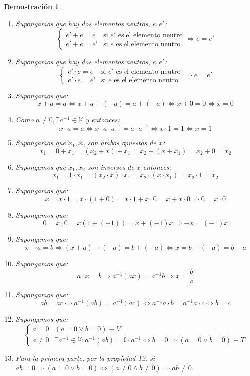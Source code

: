 \documentclass[10pt,a4paper,openright]{book}
\theoremstyle{break}
\newtheorem*{demo}{\underline{Demostración}}
\begin{document}
\begin{demo}
\begin{enumerate}
\item Supongamos que hay dos elementos neutros, $e, e'$:
 \begin{equation*}
 \begin{cases}
 e'+e=e & \mbox{si } e'\mbox{ es el elemento neutro} \\
 e'+e=e' & \mbox{si } e \mbox{ es el elemento neutro}
 \end{cases}
 \Rightarrow e=e'
 \end{equation*}
\item Supongamos que hay dos elementos neutros, $e, e'$:
 \begin{equation*}
 \begin{cases}
 e'\cdot e=e & \mbox{si } e'\mbox{ es el elemento neutro} \\
 e'\cdot e=e' & \mbox{si } e \mbox{ es el elemento neutro}
 \end{cases}
 \Rightarrow e=e'
 \end{equation*}
\item Supongamos que:
$$x+a=a\Leftrightarrow x+a+(-a)=a+(-a)\Leftrightarrow x+0=0 \Leftrightarrow x=0$$
\item Como $a\neq 0, \exists a^{-1}\in \mathbb K$ y entonces:
$$x\cdot a=a \Leftrightarrow x\cdot a \cdot a^{-1}=a\cdot a^{-1}\Leftrightarrow x\cdot 1=1 \Leftrightarrow x=1$$
\item Supongamos que $x_1, x_2$ son ambos opuestos de $x$:
$$x_1=0+x_1=(x_2+x)+x_1=x_2+(x+x_1)=x_2+0=x_2$$
\item Supongamos que $x_1, x_2$ son inversos de $x$ entonces:
$$x_1=1\cdot x_1=(x_2\cdot x)\cdot x_1=x_2\cdot (x\cdot x_1)=x_2\cdot 1=x_2$$
\item Supongamos que:
$$x=x\cdot 1=x\cdot (1+0)=x\cdot 1+ x\cdot 0=x+ x\cdot 0 \Rightarrow 0=x\cdot 0$$
\item Supongamos que:
$$0=x\cdot 0=x(1+(-1))=x+(-1)x \Rightarrow -x=(-1)x$$
\item Supongamos que:
$$x+a=b \Rightarrow (x+a)+(-a)=b+(-a)\Leftrightarrow x=b+(-a)=b-a$$
\item Supongamos que:
$$a\cdot x=b \Rightarrow a^{-1}(ax)=a^{-1}b \Rightarrow x=\frac{b}{a}$$
\item Supongamos que:
$$ab=ac \Leftrightarrow a^{-1}(ab)=a^{-1}(ac) \Leftrightarrow a^{-1}a\cdot b=a^{-1}a\cdot c \Leftrightarrow b=c$$
\item Supongamos que:
\begin{equation*}
\begin{cases}
a=0 & (a=0\vee b=0) \equiv V \\
a\neq 0 & \exists a^{-1}\in \mathbb K : a^{-1}(ab)=0\cdot a^{-1}\Leftrightarrow b=0\Rightarrow (a=0 \vee b=0)\equiv T
\end{cases} 
\end{equation*}
\item Para la primera parte, por la propiedad 12. si $ab=0\Rightarrow (a=0\vee b=0)\Leftrightarrow (a\neq 0 \wedge b\neq 0) \Rightarrow ab\neq 0$.


\end{enumerate}
\end{demo}
\end{document}
